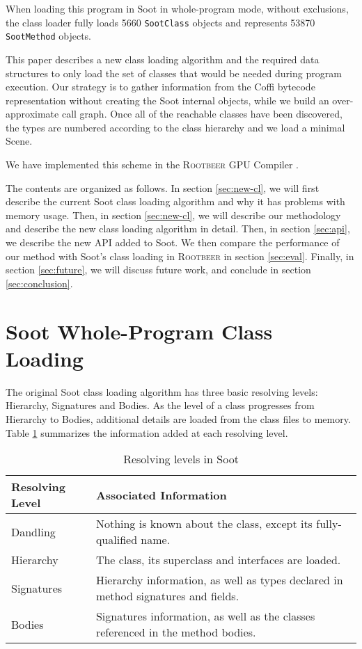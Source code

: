 \documentclass[preprint]{sigplanconf}
\begin{document}
When loading this program in Soot in whole-program mode, without exclusions, the class loader fully loads 5660 \texttt{SootClass} objects and represents 53870 \texttt{SootMethod} objects. %

This paper describes a new class loading algorithm and the required data structures to only load the set of classes that would be needed during program execution. Our strategy is to gather information from the Coffi bytecode representation without creating the Soot internal objects, while we build an over-approximate call graph. Once all of the reachable classes have been discovered, the types are numbered according to the class hierarchy and we load a minimal Scene.

We have implemented this scheme in the \textsc{Rootbeer} GPU Compiler \cite{rootbeer}. 

The contents are organized as follows. In section \ref{sec:new-cl}, we will first describe the current Soot class loading algorithm and why it has problems with memory usage. Then, in section \ref{sec:new-cl}, we will describe our methodology and describe the new class loading algorithm in detail. Then, in section \ref{sec:api}, we describe the new API added to Soot. We then compare the performance of our method with Soot's class loading in \textsc{Rootbeer} in section \ref{sec:eval}. Finally, in section \ref{sec:future}, we will discuss future work, and conclude in section \ref{sec:conclusion}.

\section{Soot Whole-Program Class Loading}
\label{sec:soot-cl}

The original Soot class loading algorithm has three basic resolving levels: Hierarchy, Signatures and Bodies. As the level of a class progresses from Hierarchy to Bodies, additional details are loaded from the class files to memory. Table \ref{tbl:resolving_levels} summarizes the information added at each resolving level. 

\begin{table}
\begin{tabularx}{\columnwidth}{|l|X|}
\hline
\textbf{Resolving Level} & \textbf{Associated Information} \\\hline
Dandling  & Nothing is known about the class, except its fully-qualified name.\\\hline
Hierarchy & The class, its superclass and interfaces are loaded. \\\hline
Signatures & Hierarchy information, as well as types declared in method signatures and fields. \\\hline
Bodies & Signatures information, as well as the classes referenced in the method bodies. \\\hline
\end{tabularx}
\caption{Resolving levels in Soot}
\label{tbl:resolving_levels}
\end{table}
\end{document}

